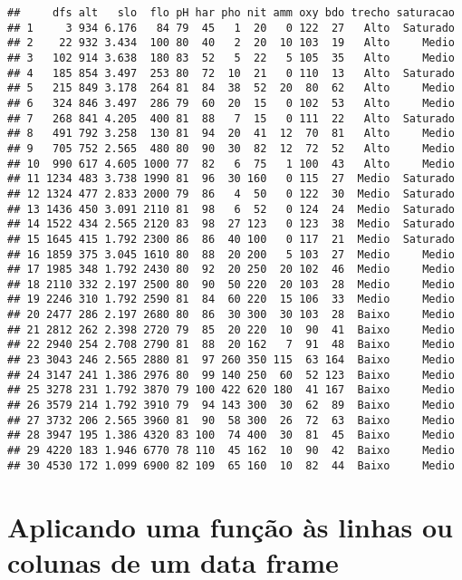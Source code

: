 \documentclass[
]{book}
\begin{document}
\begin{verbatim}
##     dfs alt   slo  flo pH har pho nit amm oxy bdo trecho saturacao
## 1     3 934 6.176   84 79  45   1  20   0 122  27   Alto  Saturado
## 2    22 932 3.434  100 80  40   2  20  10 103  19   Alto     Medio
## 3   102 914 3.638  180 83  52   5  22   5 105  35   Alto     Medio
## 4   185 854 3.497  253 80  72  10  21   0 110  13   Alto  Saturado
## 5   215 849 3.178  264 81  84  38  52  20  80  62   Alto     Medio
## 6   324 846 3.497  286 79  60  20  15   0 102  53   Alto     Medio
## 7   268 841 4.205  400 81  88   7  15   0 111  22   Alto  Saturado
## 8   491 792 3.258  130 81  94  20  41  12  70  81   Alto     Medio
## 9   705 752 2.565  480 80  90  30  82  12  72  52   Alto     Medio
## 10  990 617 4.605 1000 77  82   6  75   1 100  43   Alto     Medio
## 11 1234 483 3.738 1990 81  96  30 160   0 115  27  Medio  Saturado
## 12 1324 477 2.833 2000 79  86   4  50   0 122  30  Medio  Saturado
## 13 1436 450 3.091 2110 81  98   6  52   0 124  24  Medio  Saturado
## 14 1522 434 2.565 2120 83  98  27 123   0 123  38  Medio  Saturado
## 15 1645 415 1.792 2300 86  86  40 100   0 117  21  Medio  Saturado
## 16 1859 375 3.045 1610 80  88  20 200   5 103  27  Medio     Medio
## 17 1985 348 1.792 2430 80  92  20 250  20 102  46  Medio     Medio
## 18 2110 332 2.197 2500 80  90  50 220  20 103  28  Medio     Medio
## 19 2246 310 1.792 2590 81  84  60 220  15 106  33  Medio     Medio
## 20 2477 286 2.197 2680 80  86  30 300  30 103  28  Baixo     Medio
## 21 2812 262 2.398 2720 79  85  20 220  10  90  41  Baixo     Medio
## 22 2940 254 2.708 2790 81  88  20 162   7  91  48  Baixo     Medio
## 23 3043 246 2.565 2880 81  97 260 350 115  63 164  Baixo     Medio
## 24 3147 241 1.386 2976 80  99 140 250  60  52 123  Baixo     Medio
## 25 3278 231 1.792 3870 79 100 422 620 180  41 167  Baixo     Medio
## 26 3579 214 1.792 3910 79  94 143 300  30  62  89  Baixo     Medio
## 27 3732 206 2.565 3960 81  90  58 300  26  72  63  Baixo     Medio
## 28 3947 195 1.386 4320 83 100  74 400  30  81  45  Baixo     Medio
## 29 4220 183 1.946 6770 78 110  45 162  10  90  42  Baixo     Medio
## 30 4530 172 1.099 6900 82 109  65 160  10  82  44  Baixo     Medio
\end{verbatim}

\hypertarget{aplicando-uma-funuxe7uxe3o-uxe0s-linhas-ou-colunas-de-um-data-frame}{%
\section{Aplicando uma função às linhas ou colunas de um data frame}\label{aplicando-uma-funuxe7uxe3o-uxe0s-linhas-ou-colunas-de-um-data-frame}}
\end{document}
